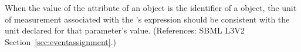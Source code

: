 When the value of the attribute  of an \EventAssignment
object is the identifier of a \Parameter object, the unit of measurement
associated with the \EventAssignment's  expression should be
consistent with the unit declared for that parameter's value.  (References:
SBML L3V2 Section~\ref{sec:eventassignment}.)

